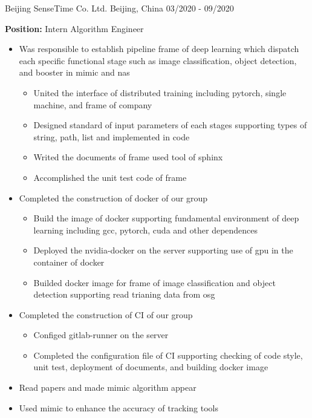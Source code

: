 

\begin{cventries}
  
  \cventry
    {}
    {Beijing SenseTime Co. Ltd.}
    {Beijing, China}
    {03/2020 - 09/2020}
    {
      \textbf{Position:} Intern Algorithm Engineer
      \begin{itemize}
        \item {Was responsible to establish pipeline frame of deep learning which dispatch each specific functional stage such as image classification, object detection, and booster in mimic and nas}
          \begin{itemize}
            \item {United the interface of distributed training including pytorch, single machine, and frame of company}
            \item {Designed standard of input parameters of each stages supporting types of string, path, list and implemented in code}
            \item {Writed the documents of frame used tool of sphinx}
            \item {Accomplished the unit test code of frame}
          \end{itemize}
        \item {Completed the construction of docker of our group}
          \begin{itemize}
            \item {Build the image of docker supporting fundamental environment of deep learning including gcc, pytorch, cuda and other dependences}
            \item {Deployed the nvidia-docker on the server supporting use of gpu in the container of docker}
            \item {Builded docker image for frame of image classification and object detection supporting read trianing data from osg}
          \end{itemize}
        \item {Completed the construction of CI of our group}
          \begin{itemize}
            \item {Configed gitlab-runner on the server}
            \item {Completed the configuration file of CI supporting checking of code style, unit test, deployment of documents, and building docker image}
          \end{itemize}
        \item {Read papers and made mimic algorithm appear}
        \item {Used mimic to enhance the accuracy of tracking tools}
      \end{itemize}
    }

\end{cventries}
